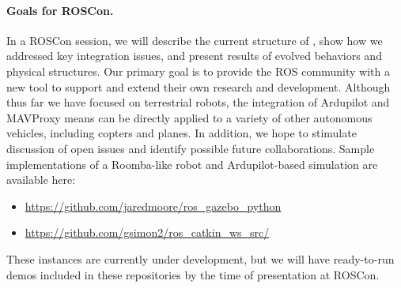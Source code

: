 \paragraph{Goals for ROSCon.}
In a ROSCon session, we will describe the current structure of {\project}, show how we addressed key integration issues, and present results of evolved behaviors and physical structures.  
%
Our primary goal is to provide the ROS community with a new tool to support and extend their own research and development.  
%
Although thus far we have focused on terrestrial robots, the integration of Ardupilot and MAVProxy means {\project} can be directly applied to a variety of other autonomous vehicles, including copters and planes.
%
In addition, we hope to stimulate discussion of open issues and identify possible future collaborations.
\clearpage
Sample implementations of a Roomba-like robot and Ardupilot-based simulation are available
here: 
\begin{itemize}
\item \url{https://github.com/jaredmoore/ros_gazebo_python}
\item \url{https://github.com/gsimon2/ros_catkin_ws_src/} 
\end{itemize}
%
These instances are currently under development, but we will have ready-to-run demos included in these repositories by the time of presentation at ROSCon.  

